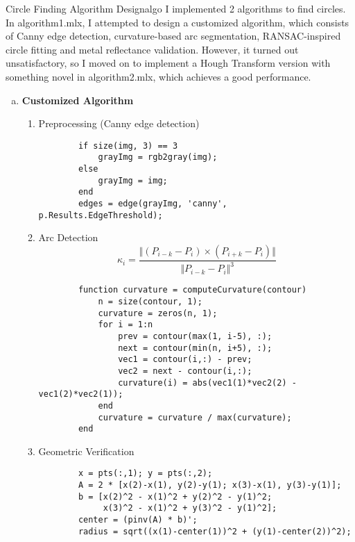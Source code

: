 \begin{problem}{Circle Finding Algorithm Design}{algo}
    I implemented 2 algorithms to find circles. In algorithm1.mlx, I attempted to design a customized algorithm, which consists of Canny edge detection, curvature-based arc segmentation, RANSAC-inspired circle fitting and metal reflectance validation. However, it turned out unsatisfactory, so I moved on to implement a Hough Transform version with something novel in algorithm2.mlx, which achieves a good performance.

\begin{enumerate}[(a)]
    \item \textbf{Customized Algorithm}
    \begin{enumerate}[label = (\roman*)]
        \item Preprocessing (Canny edge detection)
        \begin{verbatim}
        if size(img, 3) == 3
            grayImg = rgb2gray(img);
        else
            grayImg = img;
        end
        edges = edge(grayImg, 'canny', p.Results.EdgeThreshold);
        \end{verbatim}
        

        \item Arc Detection
        $$
        \kappa_i=\frac{\Vert (P_{i-k}-P_i)\times (P_{i+k}-P_i)\Vert}{\Vert P_{i-k}-P_i\Vert ^3}
        $$
        \begin{verbatim}
        function curvature = computeCurvature(contour)
            n = size(contour, 1);
            curvature = zeros(n, 1);
            for i = 1:n
                prev = contour(max(1, i-5), :);
                next = contour(min(n, i+5), :);
                vec1 = contour(i,:) - prev;
                vec2 = next - contour(i,:);
                curvature(i) = abs(vec1(1)*vec2(2) - vec1(2)*vec2(1)); 
            end
            curvature = curvature / max(curvature); 
        end
        \end{verbatim}

        \item Geometric Verification
        \begin{verbatim}
        x = pts(:,1); y = pts(:,2);
        A = 2 * [x(2)-x(1), y(2)-y(1); x(3)-x(1), y(3)-y(1)];
        b = [x(2)^2 - x(1)^2 + y(2)^2 - y(1)^2; 
             x(3)^2 - x(1)^2 + y(3)^2 - y(1)^2];
        center = (pinv(A) * b)'; 
        radius = sqrt((x(1)-center(1))^2 + (y(1)-center(2))^2);
        \end{verbatim}
    \end{enumerate}


\end{enumerate}
\end{problem}
